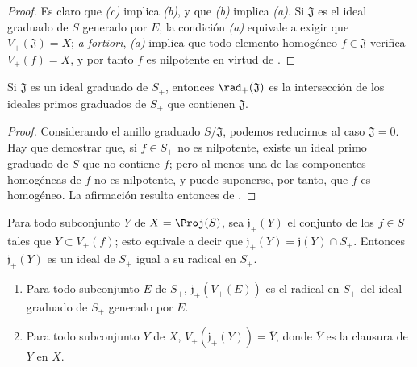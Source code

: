 \documentclass[oneside,10pt]{amsart}
\let\EGAOriginalLabel\label
\renewcommand{\label}[1]{\phantomsection\EGAOriginalLabel{#1}}
\begin{document}
\begin{proof}
Es claro que \emph{(c)} implica \emph{(b)}, y que \emph{(b)} implica \emph{(a)}.
Si $\mathfrak{J}$ es el ideal graduado de $S$ generado por $E$, la condición \emph{(a)} equivale a exigir que $V_+(\mathfrak{J})=X$; \emph{a fortiori}, \emph{(a)} implica que todo elemento homogéneo $f\in\mathfrak{J}$ verifica $V_+(f)=X$, y por tanto $f$ es nilpotente en virtud de .
\end{proof}

\begin{corollary}[2.3.9]
\label{II.2.3.9}
Si $\mathfrak{J}$ es un ideal graduado de $S_+$, entonces $\rad_+(\mathfrak{J})$ es la intersección de los ideales primos graduados de $S_+$ que contienen $\mathfrak{J}$.
\end{corollary}

\begin{proof}
Considerando el anillo graduado $S/\mathfrak{J}$, podemos reducirnos al caso $\mathfrak{J}=0$.
Hay que demostrar que, si $f\in S_+$ no es nilpotente, existe un ideal primo graduado de $S$ que no contiene $f$; pero al menos una de las componentes homogéneas de $f$ no es nilpotente, y puede suponerse, por tanto, que $f$ es homogéneo.
La afirmación resulta entonces de .
\end{proof}

\begin{env}[2.3.10]
\label{II.2.3.10}
Para todo subconjunto $Y$ de $X=\Proj(S)$, sea $\mathfrak{j}_+(Y)$ el conjunto de los $f\in S_+$ tales que $Y\subset V_+(f)$; esto equivale a decir que $\mathfrak{j}_+(Y)=\mathfrak{j}(Y)\cap S_+$.
Entonces $\mathfrak{j}_+(Y)$ es un ideal de $S_+$ igual a su radical en $S_+$.
\end{env}

\begin{proposition}[2.3.11]
\label{II.2.3.11}
\begin{enumerate}
  \item[\rm(i)] Para todo subconjunto $E$ de $S_+$, $\mathfrak{j}_+(V_+(E))$ es el radical en $S_+$ del ideal graduado de $S_+$ generado por $E$.
  \item[\rm(ii)] Para todo subconjunto $Y$ de $X$, $V_+(\mathfrak{j}_+(Y))=\overline{Y}$, donde $\overline{Y}$ es la clausura de $Y$ en $X$.
\end{enumerate}
\end{proposition}
\end{document}
